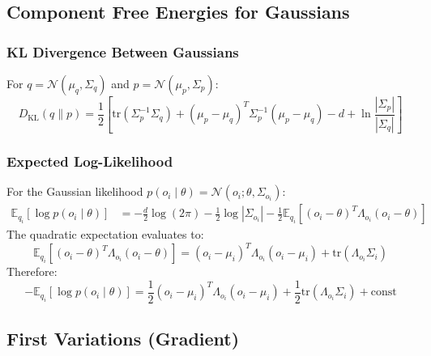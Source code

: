 \documentclass[12pt]{article}
\begin{document}
\subsection{Component Free Energies for Gaussians}

\subsubsection{KL Divergence Between Gaussians}

For $q = \mathcal{N}(\mu_q, \Sigma_q)$ and $p = \mathcal{N}(\mu_p, \Sigma_p)$:
%
\begin{equation}
D_{\mathrm{KL}}(q \| p) = \frac{1}{2}\left[\mathrm{tr}(\Sigma_p^{-1}\Sigma_q) + (\mu_p - \mu_q)^T\Sigma_p^{-1}(\mu_p - \mu_q) - d + \ln\frac{|\Sigma_p|}{|\Sigma_q|}\right]
\label{eq:kl_gaussian}
\end{equation}

\subsubsection{Expected Log-Likelihood}

For the Gaussian likelihood $p(o_i \mid \theta) = \mathcal{N}(o_i; \theta, \Sigma_{o_i})$:
%
\begin{align}
\mathbb{E}_{q_i}[\log p(o_i \mid \theta)] &= -\frac{d}{2}\log(2\pi) - \frac{1}{2}\log|\Sigma_{o_i}| - \frac{1}{2}\mathbb{E}_{q_i}\left[(o_i - \theta)^T\Lambda_{o_i}(o_i - \theta)\right]
\end{align}
%
The quadratic expectation evaluates to:
%
\begin{equation}
\mathbb{E}_{q_i}\left[(o_i - \theta)^T\Lambda_{o_i}(o_i - \theta)\right] = (o_i - \mu_i)^T\Lambda_{o_i}(o_i - \mu_i) + \mathrm{tr}(\Lambda_{o_i}\Sigma_i)
\end{equation}
%
Therefore:
%
\begin{equation}
\boxed{
-\mathbb{E}_{q_i}[\log p(o_i \mid \theta)] = \frac{1}{2}(o_i - \mu_i)^T\Lambda_{o_i}(o_i - \mu_i) + \frac{1}{2}\mathrm{tr}(\Lambda_{o_i}\Sigma_i) + \mathrm{const}
}
\label{eq:neg_log_likelihood}
\end{equation}

\subsection{First Variations (Gradient)}
\end{document}
